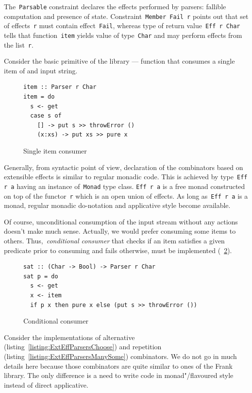       The~\texttt{Parsable} constraint declares the effects performed by parsers:
      fallible computation and presence of state. Constraint~\texttt{Member Fail r} points out that set of effects~\texttt{r} must contain effect~\texttt{Fail}, whereas type of return
      value~\texttt{Eff r Char} tells that function~\texttt{item} yields value
      of type~\texttt{Char} and may perform effects from the list~\texttt{r}.

      Consider the basic primitive of the library --- function that consumes
      a single item of and input string.

      \begin{figure}[h]
      \begin{lstlisting}
item :: Parser r Char
item = do
  s <- get
  case s of
    [] -> put s >> throwError ()
    (x:xs) -> put xs >> pure x
      \end{lstlisting}
      \caption{Single item consumer}
      \label{listing:ExtEffParsersItem}
      \end{figure}

      Generally, from syntactic point of view, declaration of the combinators based on
      extensible effects is similar to regular monadic code. This is achieved by
      type~\texttt{Eff r a} having an instance of~\texttt{Monad} type class.
      \texttt{Eff r a} is a free monad constructed on top of the functor~\texttt{r}
      which is an open union of effects. As long as~\texttt{Eff r a} is a monad,
      regular monadic do-notation and applicative style become available.

      Of course, unconditional consumption of the input stream without any actions
      doesn't make much sense. Actually, we would prefer consuming some items to others. Thus,~\emph{conditional consumer} that checks if an item satisfies a
      given predicate prior to consuming and fails otherwise, must be
      implemented (~\ref{listing:ExtEffParsersSat}).

      \begin{figure}[h]
      \begin{lstlisting}
sat :: (Char -> Bool) -> Parser r Char
sat p = do
  s <- get
  x <- item
  if p x then pure x else (put s >> throwError ())
      \end{lstlisting}
      \caption{Conditional consumer}
      \label{listing:ExtEffParsersSat}
      \end{figure}

      Consider the implementations of alternative (listing~\ref{listing:ExtEffParsersChoose})
      and repetition (listing~\ref{listing:ExtEffParsersManySome}) combinators. We
      do not go in much details here because those combinators are quite similar
      to ones of the Frank library. The only difference is a need to write
      code in monad"/flavoured style instead of direct applicative.

